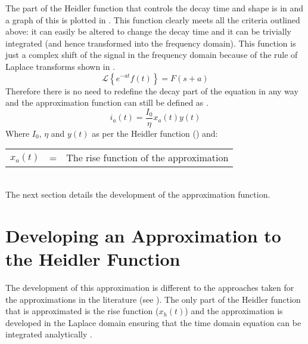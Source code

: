 The part of the Heidler function that controls the decay time and shape is in  and a graph of this is plotted in . This function clearly meets all the criteria outlined above: it can easily be altered to change the decay time and it can be trivially integrated (and hence transformed into the frequency domain).
This function is just a complex shift of the signal in the frequency domain because of the rule of Laplace transforms shown in  \cite{bkSST,bkControl}.
\begin{equation}
    \mathcal{L} \left \{ e^{-at}f\left ( t \right ) \right \} = F \left (s + a \right )
    \label{eqn:laplaceComplexShift}
\end{equation}
Therefore there is no need to redefine the decay part of the equation in any way and the approximation function can still be defined as .
\begin{equation}
i_a \left( t \right) = \frac{I_0}{\eta} x_a \left( t \right) y \left( t \right)
\label{eqn:PreTFSmall}
\end{equation}
Where $I_0$, $\eta$ and $y(t)$ as per the Heidler function () and: \\
\begin{tabular}{cll}
    $x_a \left( t \right)$ & = & The rise function of the approximation
\end{tabular}\\

The next section details the development of the approximation function.


\section{Developing an Approximation to the Heidler Function}
\label{sec:approx_methodology}
The development of this approximation is different to the approaches taken for the approximations in the literature (see ). The only part of the Heidler function that is approximated is the rise function ($x_h(t)$) and the approximation is developed in the Laplace domain ensuring that the time domain equation can be integrated analytically \cite{Terespolsky2014}.

